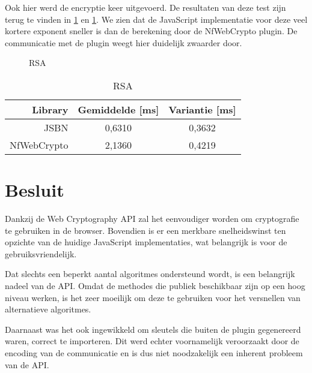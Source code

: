 \npar Ook hier werd de encryptie  keer uitgevoerd. De resultaten van deze test zijn terug te vinden in \ref{fig:wc:rsa} en \ref{tab:wc:rsa}. We zien dat de JavaScript implementatie voor deze veel kortere exponent sneller is dan de berekening door de NfWebCrypto plugin. De communicatie met de plugin weegt hier duidelijk zwaarder door.

\begin{figure}
  \caption{RSA}
  \label{fig:wc:rsa}
\end{figure}

\begin{table}
  \begin{center}
    \begin{tabular}{r | c c}
      Library & Gemiddelde [ms] & Variantie [ms] \\ \hline
      JSBN & 0,6310 & 0,3632  \\
      NfWebCrypto & 2,1360 & 0,4219
    \end{tabular}
    \caption{RSA}
    \label{tab:wc:rsa}
  \end{center}
\end{table}

\section{Besluit}

Dankzij de Web Cryptography API zal het eenvoudiger worden om cryptografie te gebruiken in de browser. Bovendien is er een merkbare snelheidswinst ten opzichte van de huidige JavaScript implementaties, wat belangrijk is voor de gebruiksvriendelijk. 

\npar Dat slechts een beperkt aantal algoritmes ondersteund wordt, is een belangrijk nadeel van de API. Omdat de methodes die publiek beschikbaar zijn op een hoog niveau werken, is het zeer moeilijk om deze te gebruiken voor het versnellen van alternatieve algoritmes.

\npar Daarnaast was het ook ingewikkeld om sleutels die buiten de plugin gegenereerd waren, correct te importeren. Dit werd echter voornamelijk veroorzaakt door de encoding van de communicatie en is dus niet noodzakelijk een inherent probleem van de API.
